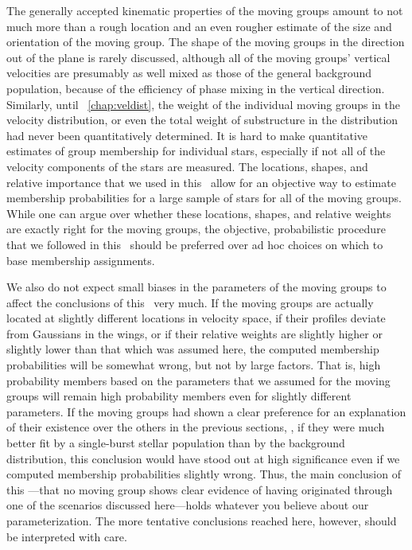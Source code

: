 The generally accepted kinematic properties of the moving groups
amount to not much more than a rough location and an even rougher
estimate of the size and orientation of the moving group. The shape of
the moving groups in the direction out of the plane is rarely
discussed, although all of the moving groups' vertical velocities are
presumably as well mixed as those of the general background
population, because of the efficiency of phase mixing in the vertical
direction. Similarly, until \chaptername~\ref{chap:veldist}, the
weight of the individual moving groups in the velocity distribution,
or even the total weight of substructure in the distribution had never
been quantitatively determined. It is hard to make quantitative
estimates of group membership for individual stars, especially if not
all of the velocity components of the stars are measured. The
locations, shapes, and relative importance that we used in
this \chaptername\ allow for an objective way to estimate membership
probabilities for a large sample of stars for all of the moving
groups. While one can argue over whether these locations, shapes, and
relative weights are exactly right for the moving groups, the
objective, probabilistic procedure that we followed in
this \chaptername\ should be preferred over ad hoc choices on which to
base membership assignments.

We also do not expect small biases in the parameters of the moving
groups to affect the conclusions of this \chaptername\ very much. If
the moving groups are actually located at slightly different locations
in velocity space, if their profiles deviate from Gaussians in the
wings, or if their relative weights are slightly higher or slightly
lower than that which was assumed here, the computed membership
probabilities will be somewhat wrong, but not by large factors. That
is, high probability members based on the parameters that we assumed
for the moving groups will remain high probability members even for
slightly different parameters. If the moving groups had shown a clear
preference for an explanation of their existence over the others in
the previous sections, \eg, if they were much better fit by a
single-burst stellar population than by the background distribution,
this conclusion would have stood out at high significance even if we
computed membership probabilities slightly wrong. Thus, the main
conclusion of this \chaptername---that no moving group shows clear
evidence of having originated through one of the scenarios discussed
here---holds whatever you believe about our parameterization. The more
tentative conclusions reached here, however, should be interpreted
with care.

